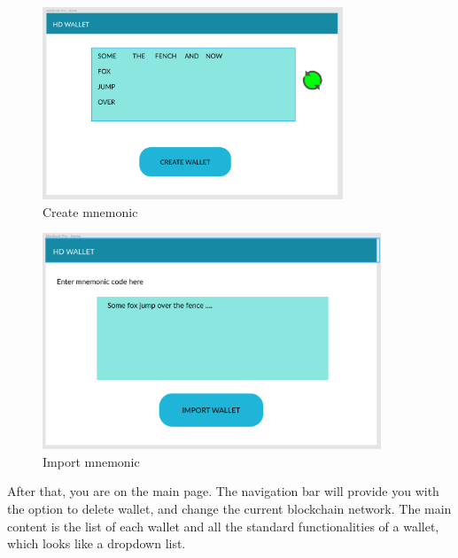 \begin{figure}[h!]
  \centering
  \includegraphics[width=0.8\textwidth]{images/component02.png}
  \caption[Create mnemonic]{Create mnemonic}
  \label{fig:create_mnemonic}
\end{figure}
\bigbreak
\begin{figure}[h!]
  \centering
  \includegraphics[width=0.9\textwidth]{images/component03.png}
  \caption[Import mnemonic]{Import mnemonic}
  \label{fig:import_mnemonic}
\end{figure}

After that, you are on the main page. The navigation bar will provide you with the option to delete wallet, and change the current blockchain network. The main content is the list of each wallet and all the standard functionalities of a wallet, which looks like a dropdown list.\\

